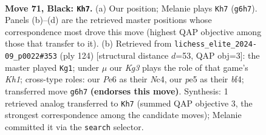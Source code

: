 \documentclass[11pt]{article}
\begin{document}
\clearpage

\begin{figure}[p]\centering
\begin{subfigure}{0.46\textwidth}\centering
\resizebox{\linewidth}{!}{%
\newchessgame
\chessboard[
  setfen={1rr5/pn6/1p2p1k1/4P1R1/2P5/K5P1/P1NB1R2/8 b - - 2 71},
  showmover=false,
  pgfstyle=straightmove, color=movearrow, markmove={g6-h7}
]}
\caption{}
\end{subfigure}\hfill
\begin{subfigure}{0.46\textwidth}\centering
\resizebox{\linewidth}{!}{%
\newchessgame
\chessboard[
  setfen={8/6p1/4p1kp/4P3/R1N2bP1/7P/2r1r3/3R3K w - - 46 63},
  showmover=false,
  pgfstyle=straightmove, color=movearrow, markmove={h1-g1}
]}
\caption{}
\end{subfigure}
\\[4pt]

\caption{\textbf{Move 71, Black: \texttt{Kh7}.} (a) Our position; Melanie plays \texttt{Kh7} (\texttt{g6h7}). Panels (b)--(d) are the retrieved master positions whose correspondence most drove this move (highest QAP objective among those that transfer to it). (b) Retrieved from \texttt{lichess\_elite\_2024-09\_p0022\#353} (ply 124) [structural distance $d$=53, QAP obj=3]: the master played \texttt{Kg1}; under $\mu$ our \emph{Kg3} plays the role of that game's \emph{Kh1}; cross-type roles: our \emph{P}e6 as their \emph{N}c4, our \emph{p}e5 as their \emph{b}f4; transferred move \texttt{g6h7} \textbf{(endorses this move)}. Synthesis: 1 retrieved analog transferred to \texttt{Kh7} (summed QAP objective 3, the strongest correspondence among the candidate moves); Melanie committed it via the \texttt{search} selector.}
\label{fig:thought-m141}
\end{figure}
\end{document}
